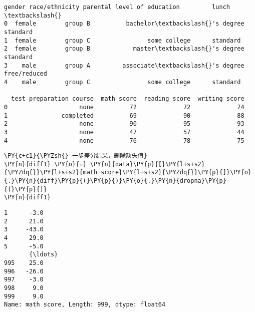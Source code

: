             \begin{tcolorbox}[breakable, size=fbox, boxrule=.5pt, pad at break*=1mm, opacityfill=0]
\begin{Verbatim}[commandchars=\\\{\}]
   gender race/ethnicity parental level of education         lunch  \textbackslash{}
0  female        group B          bachelor\textbackslash{}'s degree      standard
1  female        group C                some college      standard
2  female        group B            master\textbackslash{}'s degree      standard
3    male        group A         associate\textbackslash{}'s degree  free/reduced
4    male        group C                some college      standard

  test preparation course  math score  reading score  writing score
0                    none          72             72             74
1               completed          69             90             88
2                    none          90             95             93
3                    none          47             57             44
4                    none          76             78             75
\end{Verbatim}
\end{tcolorbox}
        
    \begin{tcolorbox}[breakable, size=fbox, boxrule=1pt, pad at break*=1mm,colback=cellbackground, colframe=cellborder]
\begin{Verbatim}[commandchars=\\\{\}]
\PY{c+c1}{\PYZsh{} 一步差分结果，删除缺失值}
\PY{n}{diff1} \PY{o}{=} \PY{n}{data}\PY{p}{[}\PY{l+s+s2}{\PYZdq{}}\PY{l+s+s2}{math score}\PY{l+s+s2}{\PYZdq{}}\PY{p}{]}\PY{o}{.}\PY{n}{diff}\PY{p}{(}\PY{p}{)}\PY{o}{.}\PY{n}{dropna}\PY{p}{(}\PY{p}{)}
\PY{n}{diff1}
\end{Verbatim}
\end{tcolorbox}

            \begin{tcolorbox}[breakable, size=fbox, boxrule=.5pt, pad at break*=1mm, opacityfill=0]
\begin{Verbatim}[commandchars=\\\{\}]
1      -3.0
2      21.0
3     -43.0
4      29.0
5      -5.0
       {\ldots}
995    25.0
996   -26.0
997    -3.0
998     9.0
999     9.0
Name: math score, Length: 999, dtype: float64
\end{Verbatim}
\end{tcolorbox}
        
